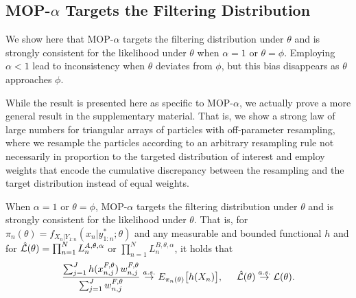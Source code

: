 \documentclass[9pt,twocolumn,pnasresearcharticle]{pnas-new}
\newcommand\arxiv[2]{#2} %
\begin{document}
\subsection{MOP-$\alpha$ Targets the Filtering Distribution}


We show here that MOP-$\alpha$ targets the filtering distribution under $\theta$ and is strongly consistent for the likelihood under $\theta$ when $\alpha=1$ or $\theta=\phi$.
Employing $\alpha<1$ lead to inconsistency when $\theta$ deviates from $\phi$, but this bias disappears as $\theta$ approaches $\phi$.

While the result is presented here as specific to MOP-$\alpha$, we actually prove a more general result in \arxiv{Appendix~\ref{appendix:targeting}}{the supplementary material}.
That is, we show a strong law of large numbers for triangular arrays of particles with off-parameter resampling, where we resample the particles according to an arbitrary resampling rule not necessarily in proportion to the targeted distribution of interest and employ weights that encode the cumulative discrepancy between the resampling and the target distribution instead of equal weights.


\begin{thm}
    \label{thm:mop-targeting}
    When $\alpha=1$ or $\theta=\phi$, MOP-$\alpha$ targets the filtering distribution under $\theta$ and is strongly consistent for the likelihood under $\theta$. That is, for $\pi_n(\theta)=f_{X_{n}|Y_{1:n}}(x_n|y_{1:n}^* ; \theta)$ and any measurable and bounded functional $h$ and for $\hat{\mathcal{L}}(\theta) = \prod_{n=1}^N L_n^{A,\theta,\alpha}$ or $\prod_{n=1}^N L_n^{B,\theta,\alpha}$, it holds that
    \arxiv{}{\vspace*{-2.5mm}}
    \begin{equation} \nonumber
        \frac{\sum_{j=1}^J h(x_{n,j}^{F, \theta}) \, w_{n,j}^{F,\theta}}{\sum_{j=1}^J w_{n,j}^{F,\theta}} \stackrel{a.s.}{\to} E_{\pi_n(\theta)} \big[h(X_n)\big], \hspace{5mm} \hat\lik(\theta)  \stackrel{a.s.}{\to} \lik(\theta).
    \arxiv{}{\vspace*{-2.5mm}}
    \end{equation}
\end{thm}
\end{document}
